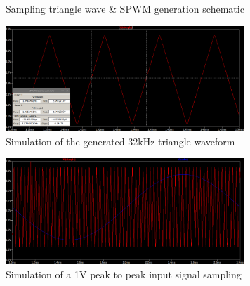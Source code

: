 \documentclass[a4paper,11pt]{article}
\begin{document}
\begin{figure}[h!]
    \centering
    \caption{Sampling triangle wave \& SPWM generation schematic}
\end{figure}

\begin{figure}[h!]
    \centering
    \includegraphics[width=0.8\textwidth]{simulation/triangle_wave.png}
    \caption{Simulation of the generated 32kHz triangle waveform}
\end{figure}

\begin{figure}[h!]
    \centering
    \includegraphics[width=0.8\textwidth]{simulation/sampling.png}
    \caption{Simulation of a 1V peak to peak input signal sampling}
\end{figure}
\end{document}
